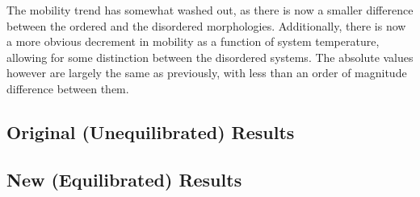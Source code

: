\documentclass[12pt]{article}
\begin{document}
The mobility trend has somewhat washed out, as there is now a smaller difference between the ordered and the disordered morphologies.
Additionally, there is now a more obvious decrement in mobility as a function of system temperature, allowing for some distinction between the disordered systems.
The absolute values however are largely the same as previously, with less than an order of magnitude difference between them.


\subsection{Original (Unequilibrated) Results}


\subsection{New (Equilibrated) Results}




\end{document}
